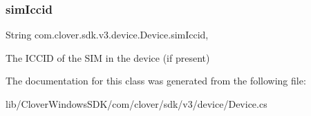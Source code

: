 \subsubsection{\texorpdfstring{sim\+Iccid}{simIccid}}
{\footnotesize\ttfamily String com.\+clover.\+sdk.\+v3.\+device.\+Device.\+sim\+Iccid\hspace{0.3cm}{\ttfamily [get]}, {\ttfamily [set]}}



The I\+C\+C\+ID of the S\+IM in the device (if present) 



The documentation for this class was generated from the following file\+:\begin{DoxyCompactItemize}
\item 
lib/\+Clover\+Windows\+S\+D\+K/com/clover/sdk/v3/device/Device.\+cs\end{DoxyCompactItemize}
